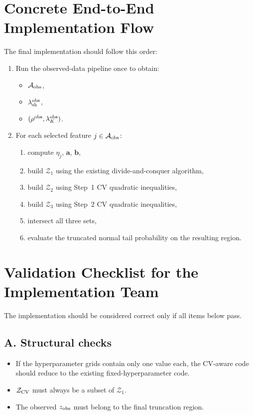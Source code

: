 \documentclass[11pt]{article}
\begin{document}
\section{Concrete End-to-End Implementation Flow}
The final implementation should follow this order:
\begin{enumerate}[leftmargin=2em]
    \item Run the observed-data pipeline once to obtain:
    \begin{itemize}[leftmargin=2em]
        \item $\mathcal{A}_{\rm obs}$,
        \item $\lambda_{\rm sh}^{\rm obs}$,
        \item $(\rho^{\rm obs}, \lambda_K^{\rm obs})$.
    \end{itemize}

    \item For each selected feature $j \in \mathcal{A}_{\rm obs}$:
    \begin{enumerate}[leftmargin=2em]
        \item compute $\eta_j$, $\bm a$, $\bm b$,
        \item build $\mathcal{Z}_1$ using the existing divide-and-conquer algorithm,
        \item build $\mathcal{Z}_2$ using Step~1 CV quadratic inequalities,
        \item build $\mathcal{Z}_3$ using Step~2 CV quadratic inequalities,
        \item intersect all three sets,
        \item evaluate the truncated normal tail probability on the resulting region.
    \end{enumerate}
\end{enumerate}

\section{Validation Checklist for the Implementation Team}
The implementation should be considered correct only if all items below pass.

\subsection*{A. Structural checks}
\begin{itemize}[leftmargin=2em]
    \item If the hyperparameter grids contain only one value each, the CV-aware code should reduce to the existing fixed-hyperparameter code.
    \item $\mathcal{Z}_{\rm CV}$ must always be a subset of $\mathcal{Z}_1$.
    \item The observed $z_{\rm obs}$ must belong to the final truncation region.
\end{itemize}
\end{document}
